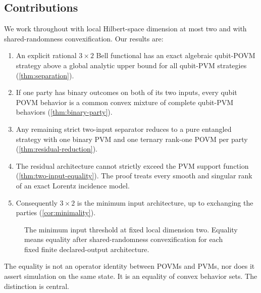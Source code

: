 \documentclass[11pt]{article}
\theoremstyle{definition}
\begin{document}
\subsection*{Contributions}

We work throughout with local Hilbert-space dimension at most two and with
shared-randomness convexification. Our results are:

\begin{enumerate}[leftmargin=*,itemsep=3pt]
\item An explicit rational \(3\times2\) Bell functional has an exact
  algebraic qubit-POVM strategy above a global analytic upper bound for all
  qubit-PVM strategies (\cref{thm:separation}).
\item If one party has binary outcomes on both of its two inputs, every qubit
  POVM behavior is a common convex mixture of complete qubit-PVM behaviors
  (\cref{thm:binary-party}).
\item Any remaining strict two-input separator reduces to a pure entangled
  strategy with one binary PVM and one ternary rank-one POVM per party
  (\cref{thm:residual-reduction}).
\item The residual architecture cannot strictly exceed the PVM support
  function (\cref{thm:two-input-equality}). The proof treats every smooth and
  singular rank of an exact Lorentz incidence model.
\item Consequently \(3\times2\) is the minimum input architecture, up to
  exchanging the parties (\cref{cor:minimality}).
\end{enumerate}

\begin{figure}[t]
\centering

\caption{The minimum input threshold at fixed local dimension two. Equality
means equality after shared-randomness convexification for each fixed finite
declared-output architecture.}
\label{fig:threshold}
\end{figure}

The equality is not an operator identity between POVMs and PVMs, nor does it
assert simulation on the same state. It is an equality of convex behavior
sets. The distinction is central.
\end{document}
